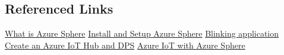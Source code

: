 \subsection{Referenced Links}
\href{https://docs.microsoft.com/en-us/azure-sphere/product-overview/what-is}{What is Azure Sphere}
\href{https://docs.microsoft.com/en-us/azure-sphere/install/overview}{Install and Setup Azure Sphere}
\href{https://docs.microsoft.com/en-us/azure-sphere/quickstarts/qs-blink-application}{Blinking application}
\href{https://docs.microsoft.com/en-us/azure/iot-dps/quick-setup-auto-provision}{Create an Azure IoT Hub and DPS}
\href{https://docs.microsoft.com/en-us/azure-sphere/app-development/use-azure-iot}{Azure IoT with Azure Sphere}
